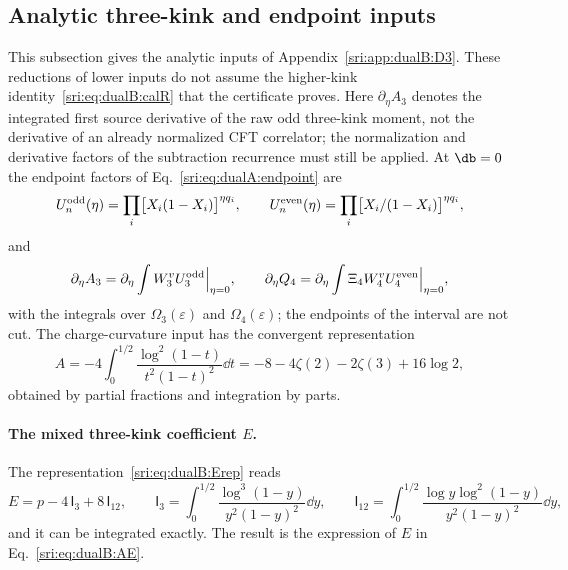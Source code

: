 \subsection{Analytic three-kink and endpoint inputs}\label{sri:app:dualB:endpoints}
This subsection gives the analytic inputs of Appendix~\ref{sri:app:dualB:D3}. These reductions of lower inputs do not
assume the higher-kink identity~\eqref{sri:eq:dualB:calR} that the certificate proves. Here $\partial_\eta A_3$ denotes the integrated first source derivative
of the raw odd three-kink moment, not the derivative of an already normalized CFT correlator; the normalization and
derivative factors of the subtraction recurrence must still be applied. At $\db=0$ the endpoint factors of
Eq.~\eqref{sri:eq:dualA:endpoint} are
\begin{equation}
 U_n^{\rm odd}(\eta)=\prod_i\bigl[X_i(1-X_i)\bigr]^{\eta q_i},\qquad
 U_n^{\rm even}(\eta)=\prod_i\bigl[X_i/(1-X_i)\bigr]^{\eta q_i},
\end{equation}
and
\begin{equation}
 \partial_\eta A_3=\partial_\eta\int W_3^vU_3^{\rm odd}\Big|_{\eta=0},\qquad
 \partial_\eta Q_4=\partial_\eta\int\Xi_4W_4^vU_4^{\rm even}\Big|_{\eta=0},
\end{equation}
with the integrals over $\Omega_3(\varepsilon)$ and $\Omega_4(\varepsilon)$; the endpoints of the interval are not cut.
The charge-curvature input has the convergent representation
\begin{equation}
 A=-4\int_0^{1/2}\frac{\log^2(1-t)}{t^2(1-t)^2}\dd t=-8-4\zeta(2)-2\zeta(3)+16\log2,
\end{equation}
obtained by partial fractions and integration by parts.

\paragraph{The mixed three-kink coefficient $E$.} The representation~\eqref{sri:eq:dualB:Erep} reads
\begin{equation}
 E=p-4\,\mathsf I_3+8\,\mathsf I_{12},\qquad
 \mathsf I_3=\int_0^{1/2}\frac{\log^3(1-y)}{y^2(1-y)^2}\dd y,\qquad
 \mathsf I_{12}=\int_0^{1/2}\frac{\log y\log^2(1-y)}{y^2(1-y)^2}\dd y,
 \label{sri:eq:dualB:Estart}
\end{equation}
and it can be integrated exactly. The result is the expression of $E$ in Eq.~\eqref{sri:eq:dualB:AE}.

